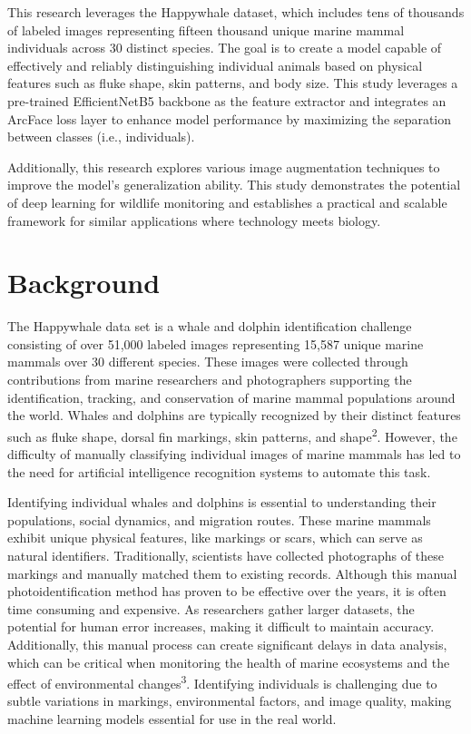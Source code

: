 \documentclass[twocolumn]{article}
\begin{document}
This research leverages the Happywhale dataset, which includes tens of thousands of labeled images representing fifteen thousand unique marine mammal individuals across 30 distinct species. The goal is to create a model capable of effectively and reliably distinguishing individual animals based on physical features such as fluke shape, skin patterns, and body size. This study leverages a pre-trained EfficientNetB5 backbone as the feature extractor and integrates an ArcFace loss layer to enhance model performance by maximizing the separation between classes (i.e., individuals).

Additionally, this research explores various image augmentation techniques to improve the model's generalization ability. This study demonstrates the potential of deep learning for wildlife monitoring and establishes a practical and scalable framework for similar applications where technology meets biology.

\section{Background}
The Happywhale data set is a whale and dolphin identification challenge consisting of over 51,000 labeled images representing 15,587 unique marine mammals over 30 different species. These images were collected through contributions from marine researchers and photographers supporting the identification, tracking, and conservation of marine mammal populations around the world. Whales and dolphins are typically recognized by their distinct features such as fluke shape, dorsal fin markings, skin patterns, and shape\textsuperscript{2}. However, the difficulty of manually classifying individual images of marine mammals has led to the need for artificial intelligence recognition systems to automate this task. 

Identifying individual whales and dolphins is essential to understanding their populations, social dynamics, and migration routes. These marine mammals exhibit unique physical features, like markings or scars, which can serve as natural identifiers. Traditionally, scientists have collected photographs of these markings and manually matched them to existing records. Although this manual photoidentification method has proven to be effective over the years, it is often time consuming and expensive. As researchers gather larger datasets, the potential for human error increases, making it difficult to maintain accuracy. Additionally, this manual process can create significant delays in data analysis, which can be critical when monitoring the health of marine ecosystems and the effect of environmental changes\textsuperscript{3}. Identifying individuals is challenging due to subtle variations in markings, environmental factors, and image quality, making machine learning models essential for use in the real world.
\end{document}
